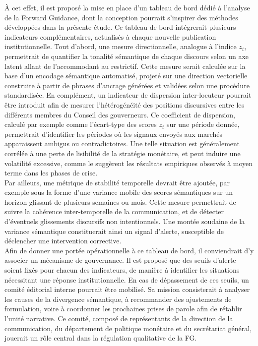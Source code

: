 À cet effet, il est proposé la mise en place d’un tableau de bord dédié à l’analyse de la Forward Guidance, dont la conception pourrait s’inspirer des méthodes développées dans la présente étude. Ce tableau de bord intégrerait plusieurs indicateurs complémentaires, actualisés à chaque nouvelle publication institutionnelle. Tout d’abord, une mesure directionnelle, analogue à l’indice $z_t$, permettrait de quantifier la tonalité sémantique de chaque discours selon un axe latent allant de l’accommodant au restrictif. Cette mesure serait calculée sur la base d’un encodage sémantique automatisé, projeté sur une direction vectorielle construite à partir de phrases d’ancrage générées et validées selon une procédure standardisée. En complément, un indicateur de dispersion inter-locuteur pourrait être introduit afin de mesurer l’hétérogénéité des positions discursives entre les différents membres du Conseil des gouverneurs. Ce coefficient de dispersion, calculé par exemple comme l’écart-type des scores $z_t$ sur une période donnée, permettrait d’identifier les périodes où les signaux envoyés aux marchés apparaissent ambigus ou contradictoires. Une telle situation est généralement corrélée à une perte de lisibilité de la stratégie monétaire, et peut induire une volatilité excessive, comme le suggèrent les résultats empiriques observés à moyen terme dans les phases de crise.\\

Par ailleurs, une métrique de stabilité temporelle devrait être ajoutée, par exemple sous la forme d’une variance mobile des scores sémantiques sur un horizon glissant de plusieurs semaines ou mois. Cette mesure permettrait de suivre la cohérence inter-temporelle de la communication, et de détecter d’éventuels glissements discursifs non intentionnels. Une montée soudaine de la variance sémantique constituerait ainsi un signal d’alerte, susceptible de déclencher une intervention corrective.\\

Afin de donner une portée opérationnelle à ce tableau de bord, il conviendrait d’y associer un mécanisme de gouvernance. Il est proposé que des seuils d’alerte soient fixés pour chacun des indicateurs, de manière à identifier les situations nécessitant une réponse institutionnelle. En cas de dépassement de ces seuils, un comité éditorial interne pourrait être mobilisé. Sa mission consisterait à analyser les causes de la divergence sémantique, à recommander des ajustements de formulation, voire à coordonner les prochaines prises de parole afin de rétablir l’unité narrative. Ce comité, composé de représentants de la direction de la communication, du département de politique monétaire et du secrétariat général, jouerait un rôle central dans la régulation qualitative de la FG.\\

